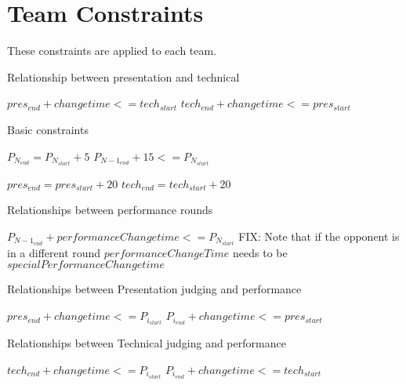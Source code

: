 \documentclass[letterpaper,11pt]{report}
\begin{document}
\section{Team Constraints}
These constraints are applied to each team.

\begin{algorithm}
\caption{Relationship between presentation and technical}
\begin{algorithmic}
  \STATE $pres_{end} + changetime <= tech_{start}$
\ELSE
  \STATE $tech_{end} + changetime <= pres_{start}$
\ENDIF
\end{algorithmic}
\end{algorithm}

\begin{algorithm}
\caption{Basic constraints}
\begin{algorithmic}
  \STATE $P_{N_{end}} = P_{N_{start}} + 5$
\ENDFOR
{}
  \STATE $P_{{N-1}_{end}} + 15 <= P_{N_{start}}$
\ENDFOR

\STATE $pres_{end} = pres_{start} + 20$
\STATE $tech_{end} = tech_{start} + 20$
\end{algorithmic}
\end{algorithm}

\begin{algorithm}
\caption{Relationships between performance rounds}
\begin{algorithmic}
  \STATE $P_{{N-1}_{end}} + performanceChangetime <= P_{N_{start}}$ \COMMENT FIX: Note that if the opponent is in a different round $performanceChangeTime$ needs to be $specialPerformanceChangetime$
\ENDFOR
\end{algorithmic}
\end{algorithm}

\begin{algorithm}
\caption{Relationships between Presentation judging and performance}
\begin{algorithmic}
    \STATE $pres_{end} + changetime <= P_{i_{start}}$
  \ELSE
    \STATE $P_{i_{end}} + changetime <= pres_{start}$
  \ENDIF
\ENDFOR
\end{algorithmic}
\end{algorithm}

\begin{algorithm}
\caption{Relationships between Technical judging and performance}
\begin{algorithmic}
    \STATE $tech_{end} + changetime <= P_{i_{start}}$
  \ELSE
    \STATE $P_{i_{end}} + changetime <= tech_{start}$
  \ENDIF
\ENDFOR
\end{algorithmic}
\end{algorithm}
\end{document}
